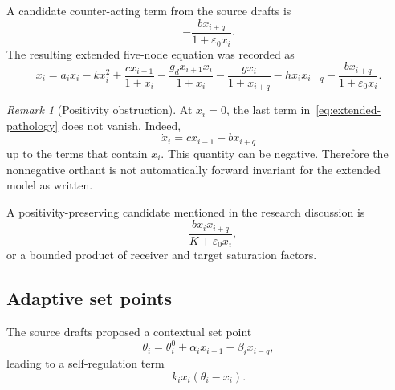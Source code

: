 \documentclass[11pt, reqno]{amsart}
\theoremstyle{definition}
\theoremstyle{remark}
\newtheorem{remark}[theorem]{Remark}
\newcommand{\eps}{\varepsilon}
\begin{document}
A candidate counter-acting term from the source drafts is
\begin{equation}
\label{eq:wu-term-original}
    -\frac{b x_{i+q}}{1+\eps_0x_i}.
\end{equation}
The resulting extended five-node equation was recorded as
\begin{equation}
\label{eq:extended-pathology}
\dot x_i
=
 a_i x_i-kx_i^2
 +\frac{c x_{i-1}}{1+x_i}
 -\frac{g_d x_{i+1}x_i}{1+x_i}
 -\frac{g x_i}{1+x_{i+q}}
 -h x_i x_{i-q}
 -\frac{b x_{i+q}}{1+\eps_0x_i}.
\end{equation}

\begin{remark}[Positivity obstruction]
At $x_i=0$, the last term in~\eqref{eq:extended-pathology} does not vanish.
Indeed,
\[
    \dot x_i
    =
    c x_{i-1}-b x_{i+q}
\]
up to the terms that contain $x_i$.  This quantity can be negative.  Therefore
the nonnegative orthant is not automatically forward invariant for the
extended model as written.
\end{remark}

A positivity-preserving candidate mentioned in the research discussion is
\begin{equation}
\label{eq:wu-positive-candidate}
    -\frac{b x_i x_{i+q}}{K+\eps_0x_i},
\end{equation}
or a bounded product of receiver and target saturation factors.


\subsection{Adaptive set points}

The source drafts proposed a contextual set point
\begin{equation}
\label{eq:adaptive-setpoint}
    \theta_i
    =
    \theta_i^0
    +\alpha_i x_{i-1}
    -\beta_i x_{i-q},
\end{equation}
leading to a self-regulation term
\begin{equation}
\label{eq:adaptive-logistic}
    k_i x_i(\theta_i-x_i).
\end{equation}

\end{document}
